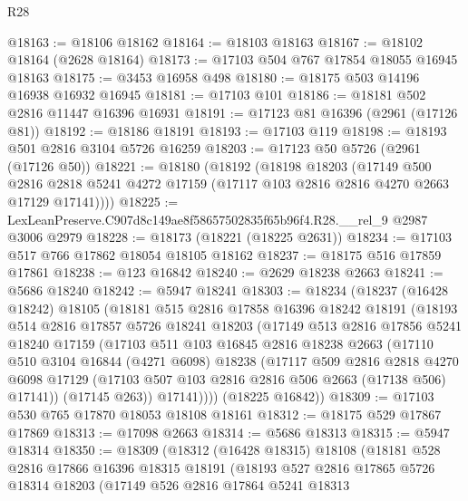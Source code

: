 \begin{lexlean}{R28}
\begin{coremodule}
@18163 := @18106 @18162
@18164 := @18103 @18163
@18167 := @18102 @18164 (@2628 @18164)
@18173 := @17103 @504 @767 @17854 @18055 @16945 @18163
@18175 := @3453 @16958 @498
@18180 := @18175 @503 @14196 @16938 @16932 @16945
@18181 := @17103 @101
@18186 := @18181 @502 @2816 @11447 @16396 @16931
@18191 := @17123 @81 @16396 (@2961 (@17126 @81))
@18192 := @18186 @18191
@18193 := @17103 @119
@18198 := @18193 @501 @2816 @3104 @5726 @16259
@18203 := @17123 @50 @5726 (@2961 (@17126 @50))
@18221 := @18180
    (@18192
      (@18198
        @18203
        (@17149
          @500
          @2816
          @2818
          @5241
          @4272
          @17159
          (@17117 @103 @2816 @2816 @4270 @2663 @17129 @17141))))
@18225 := LexLeanPreserve.C907d8c149ae8f58657502835f65b96f4.R28.__rel_9 @2987 @3006 @2979
@18228 := @18173 (@18221 (@18225 @2631))
@18234 := @17103 @517 @766 @17862 @18054 @18105 @18162
@18237 := @18175 @516 @17859 @17861
@18238 := @123 @16842
@18240 := @2629 @18238 @2663
@18241 := @5686 @18240
@18242 := @5947 @18241
@18303 := @18234
    (@18237
      (@16428 @18242)
      @18105
      (@18181
        @515
        @2816
        @17858
        @16396
        @18242
        @18191
        (@18193
          @514
          @2816
          @17857
          @5726
          @18241
          @18203
          (@17149
            @513
            @2816
            @17856
            @5241
            @18240
            @17159
            (@17103
              @511
              @103
              @16845
              @2816
              @18238
              @2663
              (@17110
                @510
                @3104
                @16844
                (@4271 @6098)
                @18238
                (@17117
                  @509
                  @2816
                  @2818
                  @4270
                  @6098
                  @17129
                  (@17103 @507 @103 @2816 @2816 @506 @2663 (@17138 @506) @17141))
                (@17145 @263))
              @17141))))
      (@18225 @16842))
@18309 := @17103 @530 @765 @17870 @18053 @18108 @18161
@18312 := @18175 @529 @17867 @17869
@18313 := @17098 @2663
@18314 := @5686 @18313
@18315 := @5947 @18314
@18350 := @18309
    (@18312
      (@16428 @18315)
      @18108
      (@18181
        @528
        @2816
        @17866
        @16396
        @18315
        @18191
        (@18193
          @527
          @2816
          @17865
          @5726
          @18314
          @18203
          (@17149
            @526
            @2816
            @17864
            @5241
            @18313

\end{coremodule}
\end{lexlean}
